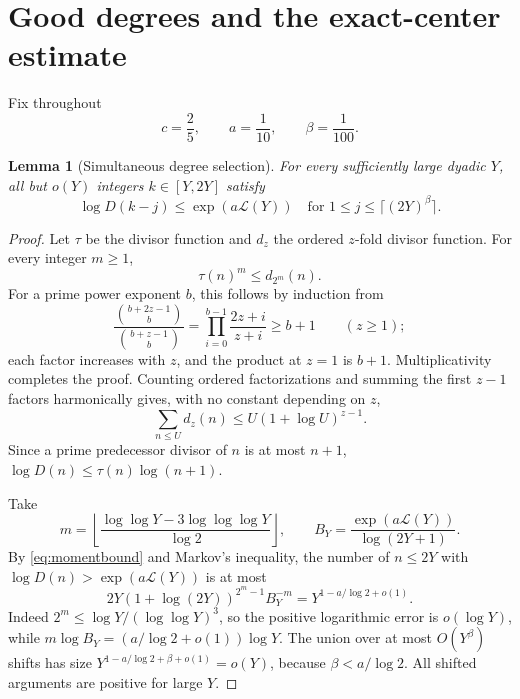 \documentclass[11pt]{amsart}
\numberwithin{equation}{section}
\newtheorem{lemma}[theorem]{Lemma}
\theoremstyle{remark}
\begin{document}
\section{Good degrees and the exact-center estimate}\label{sec:centers}

Fix throughout
\begin{equation}\label{eq:parameters}
 c=\frac25,\qquad a=\frac1{10},\qquad \beta=\frac1{100}.
\end{equation}

\begin{lemma}[Simultaneous degree selection]\label{lem:selection}
For every sufficiently large dyadic \(Y\), all but \(o(Y)\) integers
\(k\in[Y,2Y]\) satisfy
\begin{equation}\label{eq:good}
 \log D(k-j)\le \exp(a\mathcal L(Y))
 \quad\text{for }1\le j\le\lceil(2Y)^\beta\rceil.
\end{equation}
\end{lemma}
\begin{proof}
Let \(\tau\) be the divisor function and \(d_z\) the ordered
\(z\)-fold divisor function. For every integer \(m\ge1\),
\[
 \tau(n)^m\le d_{2^m}(n).
\]
For a prime power exponent \(b\), this follows by induction from
\[
 \frac{\binom{b+2z-1}{b}}{\binom{b+z-1}{b}}
 =\prod_{i=0}^{b-1}\frac{2z+i}{z+i}\ge b+1\qquad(z\ge1);
\]
each factor increases with \(z\), and the product at \(z=1\) is \(b+1\).
Multiplicativity completes the proof.
Counting ordered factorizations and summing the first \(z-1\) factors
harmonically gives, with no constant depending on \(z\),
\begin{equation}\label{eq:momentbound}
 \sum_{n\le U}d_z(n)\le U(1+\log U)^{z-1}.
\end{equation}
Since a prime predecessor divisor of \(n\) is at most \(n+1\),
\(\log D(n)\le\tau(n)\log(n+1)\).

Take
\[
 m=\left\lfloor\frac{\log\log Y-3\log\log\log Y}{\log2}\right\rfloor,
 \qquad
 B_Y=\frac{\exp(a\mathcal L(Y))}{\log(2Y+1)}.
\]
By \eqref{eq:momentbound} and Markov's inequality, the number of
\(n\le2Y\) with \(\log D(n)>\exp(a\mathcal L(Y))\) is at most
\[
 2Y(1+\log(2Y))^{2^m-1}B_Y^{-m}
   =Y^{1-a/\log2+o(1)}.
\]
Indeed \(2^m\le\log Y/(\log\log Y)^3\), so the positive logarithmic
error is \(o(\log Y)\), while
\(m\log B_Y=(a/\log2+o(1))\log Y\).
The union over at most \(O(Y^\beta)\) shifts has size
\(Y^{1-a/\log2+\beta+o(1)}=o(Y)\), because
\(\beta<a/\log2\). All shifted arguments are positive for large \(Y\).
\end{proof}
\end{document}
